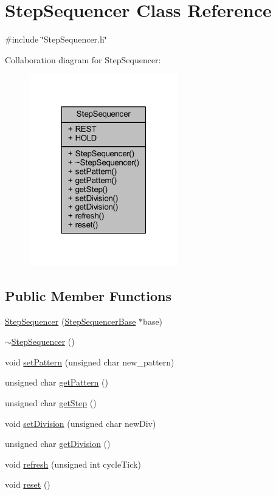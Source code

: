 \hypertarget{class_step_sequencer}{}\section{Step\+Sequencer Class Reference}
\label{class_step_sequencer}


{\ttfamily \#include \char`\"{}Step\+Sequencer.\+h\char`\"{}}



Collaboration diagram for Step\+Sequencer\+:
\nopagebreak
\begin{figure}[H]
\begin{center}
\leavevmode
\includegraphics[width=184pt]{dd/d12/class_step_sequencer__coll__graph}
\end{center}
\end{figure}
\subsection*{Public Member Functions}
\begin{DoxyCompactItemize}
\item 
\hyperlink{class_step_sequencer_a552647854b6f7c5d653432774c357f3e}{Step\+Sequencer} (\hyperlink{class_step_sequencer_base}{Step\+Sequencer\+Base} $\ast$base)
\item 
\hyperlink{class_step_sequencer_a82bc995a1e19baecda84708de8fa265f}{$\sim$\+Step\+Sequencer} ()
\item 
void \hyperlink{class_step_sequencer_ac611afad54d4336977925b7f3495e8b4}{set\+Pattern} (unsigned char new\+\_\+pattern)
\item 
unsigned char \hyperlink{class_step_sequencer_a6c3987d5f4a966e8fcde3f7926aca54e}{get\+Pattern} ()
\item 
unsigned char \hyperlink{class_step_sequencer_ad00472eb91462892049d5e4757e29af3}{get\+Step} ()
\item 
void \hyperlink{class_step_sequencer_a5d62b641961ca9eaef9273efb9ed38b0}{set\+Division} (unsigned char new\+Div)
\item 
unsigned char \hyperlink{class_step_sequencer_a06c5c7b852aee258ad8b245058cee6ad}{get\+Division} ()
\item 
void \hyperlink{class_step_sequencer_a706e6a91c6b3ccd606876f57c334b311}{refresh} (unsigned int cycle\+Tick)
\item 
void \hyperlink{class_step_sequencer_afc3d99a316fa16322c1a582a49e8f272}{reset} ()
\end{DoxyCompactItemize}
